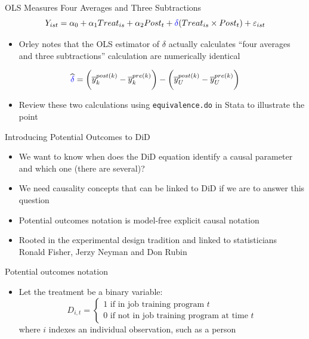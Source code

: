\documentclass{beamer}
\begin{document}
\begin{frame}{OLS Measures Four Averages and Three Subtractions}
$$Y_{ist} = \alpha_0 + \alpha_1 Treat_{is} + \alpha_2 Post_{t} + \textcolor{blue}{\delta} (Treat_{is} \times Post_t) + \varepsilon_{ist} $$

\bigskip

\begin{itemize}
\item Orley notes that the OLS estimator of $\delta$ actually calculates ``four averages and three subtractions'' calculation are numerically identical 
\end{itemize}

\bigskip

$$\widehat{\textcolor{blue}{\delta}} = \bigg ( \overline{y}_k^{post(k)} - \overline{y}_k^{pre(k)} \bigg ) - \bigg ( \overline{y}_U^{post(k)} - \overline{y}_U^{pre(k)} \bigg ) $$

\begin{itemize}
\item Review these two calculations using \texttt{equivalence.do} in Stata to illustrate the point
\end{itemize}


\end{frame}

\begin{frame}{Introducing Potential Outcomes to DiD}

\begin{itemize}
\item We want to know when does the DiD equation identify a causal parameter and which one (there are several)?
\item We need causality concepts that can be linked to DiD if we are to answer this question
\item Potential outcomes notation is model-free explicit causal notation 
\item Rooted in the experimental design tradition and linked to statisticians Ronald Fisher, Jerzy Neyman and Don Rubin
\end{itemize}

\end{frame}




\begin{frame}{Potential outcomes notation}
	
	\begin{itemize}
	\item Let the treatment be a binary variable: $$D_{i,t} =\begin{cases} 1 \text{ if in job training program $t$} \\ 0 \text{ if not in job training program at time $t$} \end{cases}$$where $i$ indexes an individual observation, such as a person

	\end{itemize}
\end{frame}
\end{document}
